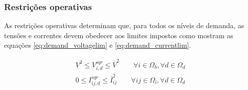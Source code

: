 \subsubsection{Restrições operativas}

As restrições operativas determinam que, para todos os níveis de demanda, as tensões e correntes devem obedecer aos limites impostos como mostram as equações \eqref{eq:demand_voltagelim} e \eqref{eq:demand_currentlim}.

\begin{align}\label{eq:demand_voltagelim}
    \underline{V}^{2} \leq V_{i,d}^{sqr} \leq \overline{V}^{2}\qquad\forall i \in\Omega_{b},\forall d\in\Omega_d\\
    \label{eq:demand_currentlim}
    0 \leq I_{ij,d}^{sqr} \leq \overline{I}_{ij}^{2} \qquad\forall ij\in\Omega_{l},\forall d\in\Omega_d
\end{align}





